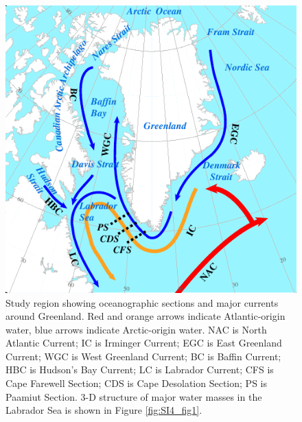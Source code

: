 \clearpage
\begin{figure}
	\centering
	\includegraphics{figs_chpt4/Fig1.pdf}	
	\caption[Study region showing oceanographic sections and major currents around Greenland.]{Study region showing oceanographic sections and major currents around Greenland.  Red and orange arrows indicate Atlantic-origin water, blue arrows indicate Arctic-origin water.   NAC is North Atlantic Current; IC is Irminger Current; EGC is East Greenland Current; WGC is West Greenland Current; BC is Baffin Current; HBC is Hudson’s Bay Current; LC is Labrador Current; CFS is Cape Farewell Section; CDS is Cape Desolation Section; PS is Paamiut Section.  3-D structure of major water masses in the Labrador Sea is shown in Figure \ref{fig:SI4_fig1}.}
	\label{fig:chpt4_fig1}
\end{figure}

